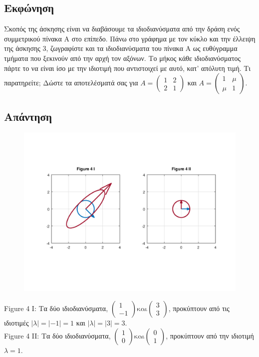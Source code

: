 \documentclass[a4paper,12pt]{article}
\begin{document}
\subsection{Εκφώνηση}
Σκοπός της άσκησης είναι να διαβάσουμε τα ιδιοδιανύσματα από την δράση ενός
συμμετρικού πίνακα Α στο επίπεδο. Πάνω στο γράφημα με τον κύκλο και την
έλλειψη της άσκησης 3, ζωγραφίστε και τα ιδιοδιανύσματα του πίνακα Α ως
ευθύγραμμα τμήματα που ξεκινούν από την αρχή τον αξόνων. Το μήκος κάθε
ιδιοδιανύσματος πάρτε το να είναι ίσο με την ιδιοτιμή που αντιστοιχεί με
αυτό, κατ' απόλυτη τιμή. Τι παρατηρείτε; Δώστε
τα αποτελέσματά σας για $
	A=\begin{pmatrix}
		1 & 2 \\
		2 & 1
	\end{pmatrix}
$ και $
	A=\begin{pmatrix}
		1   & \mu \\
		\mu & 1
	\end{pmatrix}
$.
\subsection{Απάντηση}
\begin{center}
	\begin{figure}[H]
		\centering
		\includegraphics[scale=0.8]{4i_ii.png}
	\end{figure}
	Figure 4 I: Τα δύο ιδιοδιανύσματα, $
		\begin{pmatrix}
			1 \\
			-1
		\end{pmatrix} \text{και}
		\begin{pmatrix}
			3 \\
			3
		\end{pmatrix}
	$, προκύπτουν από τις ιδιοτιμές $|λ|=|-1|=1$ και $|λ|=|3|=3$.\\
	Figure 4 II: Τα δύο ιδιοδιανύσματα, $
		\begin{pmatrix}
			1 \\
			0
		\end{pmatrix} \text{και}
		\begin{pmatrix}
			0 \\
			1
		\end{pmatrix}
	$, προκύπτουν από την ιδιοτιμή $λ=1$.
\end{center}
\end{document}
